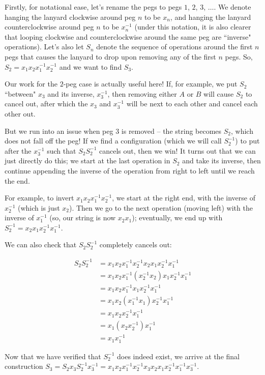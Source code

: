 \documentclass{article}
\begin{document}
Firstly, for notational ease, let's rename the pegs to pegs $1$, $2$, $3$, $\dots$. We denote hanging the lanyard clockwise around peg $n$ to be $x_n$, and hanging the lanyard counterclockwise around peg $n$ to be $x_n^{-1}$ (under this notation, it is also clearer that looping clockwise and counterclockwise around the same peg are ``inverse" operations). Let's also let $S_n$ denote the sequence of operations around the first $n$ pegs that causes the lanyard to drop upon removing any of the first $n$ pegs. So, $S_2=x_1x_2x_1^{-1}x_2^{-1}$ and we want to find $S_3$.

Our work for the $2$-peg case is actually useful here! If, for example, we put $S_2$ ``between" $x_3$ and its inverse, $x_3^{-1}$, then removing either $A$ or $B$ will cause $S_2$ to cancel out, after which the $x_3$ and $x_3^{-1}$ will be next to each other and cancel each other out.

But we run into an issue when peg 3 is removed -- the string becomes $S_2$, which does not fall off the peg! If we find a configuration (which we will call $S_2^{-1}$) to put after the $x_3^{-1}$ such that $S_2S_2^{-1}$ cancels out, then we win! 
It turns out that we can just directly do this; we start at the last operation in $S_2$ and take its inverse, then continue appending the inverse of the operation from right to left until we reach the end.

For example, to invert $x_1x_2x_1^{-1}x_2^{-1}$, we start at the right end, with the inverse of $x_2^{-1}$ (which is just $x_2$). Then we go to the next operation (moving left) with the inverse of $x_1^{-1}$ (so, our string is now $x_2x_1$); eventually, we end up with $S_2^{-1}=x_2x_1x_2^{-1}x_1^{-1}$. 

We can also check that $S_2S_2^{-1}$ completely cancels out:

\begin{align*}
	S_2S_2^{-1}&= x_1x_2x_1^{-1}x_2^{-1}x_2x_1x_2^{-1}x_1^{-1} \\
	&= x_1x_2x_1^{-1}(x_2^{-1}x_2)x_1x_2^{-1}x_1^{-1} \\
	&= x_1x_2x_1^{-1}x_1x_2^{-1}x_1^{-1} \\
	&= x_1x_2(x_1^{-1}x_1)x_2^{-1}x_1^{-1} \\
	&= x_1x_2x_2^{-1}x_1^{-1} \\
	&= x_1(x_2x_2^{-1})x_1^{-1} \\
	&= x_1x_1^{-1}
\end{align*}

Now that we have verified that $S_2^{-1}$ does indeed exist, we arrive at the final construction $S_3=S_2x_3S_2^{-1}x_3^{-1}=x_1x_2x_1^{-1}x_2^{-1}x_3x_2x_1x_2^{-1}x_1^{-1}x_3^{-1}$.
\end{document}
